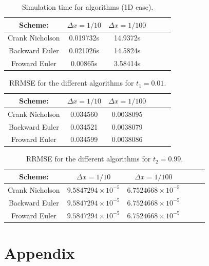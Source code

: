 \documentclass{article}
\begin{document}
\begin{table}[H]
\begin{center}
\caption{Simulation time for algorithms (1D case).}
\begin{tabular}{  |c|c|c|c|c|c| } \hline
Scheme:&	$\Delta x = 1/10$&$\Delta x = 1/100$ \\ \hline
Crank Nicholson&0.019732s&14.9372s\\ \hline
Backward Euler&0.021026s&14.5824s\\ \hline
Froward Euler&	0.00865s&3.58414s\\ \hline
\end{tabular}
\label{tab:time}
\end{center}
\end{table}

\begin{table}[H]
\begin{center}
\caption{RRMSE for the different algorithms for $t_1=0.01$.}
\begin{tabular}{  |c|c|c|c|c|c| } \hline
Scheme:&	$\Delta x =1/10$&$\Delta x = 1/100$ \\ \hline
Crank Nicholson&0.034560&0.0038095\\ \hline
Backward Euler&0.034521&0.0038079\\ \hline
Froward Euler&0.034599&0.0038086\\ \hline
\end{tabular}
\label{tab:error}
\end{center}
\end{table}

\begin{table}[H]
\begin{center}
\caption{RRMSE for the different algorithms for $t_2=0.99$.}
\begin{tabular}{  |c|c|c|c|c|c| } \hline
Scheme:&	$\Delta x =1/10$&$\Delta x = 1/100$ \\ \hline
Crank Nicholson&$9.5847294\times 10^{-5}$&$6.7524668\times10^{-5}$\\ \hline
Backward Euler&$9.5847294\times 10^{-5}$&$6.7524668\times10^{-5}$\\ \hline
Froward Euler&$9.5847294\times 10^{-5}$&$6.7524668\times10^{-5}$\\ \hline
\end{tabular}
\label{tab:error2}
\end{center}
\end{table}

\clearpage

\section{Appendix}
\end{document}
